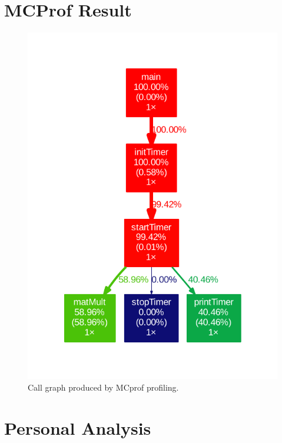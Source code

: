 \documentclass[final]{article} %
\begin{document}
\begin{appendices}


\section{MCProf Result}\label{app:appendix-mcprof-result}

\begin{figure}[H]
\centering
\includegraphics[scale=0.7]{resources/callgraphAll.pdf}
\caption{Call graph produced by MCprof profiling.}
\label{fig:callgraphall}
\end{figure}

\section{Personal Analysis}\label{app:appendix-personal-analysis}


\end{appendices}
\end{document}
